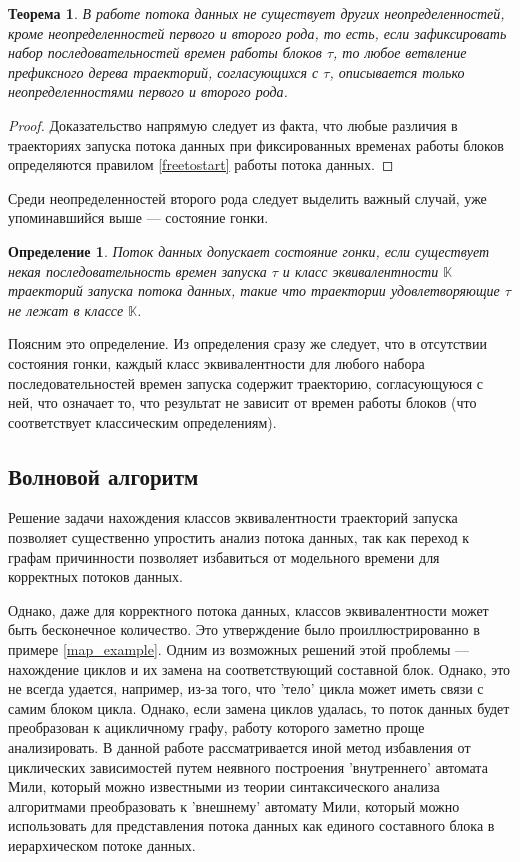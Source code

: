 \documentclass[10pt,a4paper]{article}
\newtheorem{defen}{Определение}
\newtheorem{theorem}{Теорема}
\begin{document}
  \begin{theorem}
    \label{indeterminacy_theorem}
    В работе потока данных не существует других неопределенностей, кроме неопределенностей первого и второго рода, то есть,
    если зафиксировать набор последовательностей времен работы блоков $\tau$, то любое ветвление префиксного дерева траекторий, согласующихся с $\tau$,
    описывается только неопределенностями первого и второго рода.
  \end{theorem}
  \begin{proof}
    Доказательство напрямую следует из факта, что любые различия в траекториях запуска потока данных при фиксированных временах работы блоков определяются
    правилом \eqref{freetostart} работы потока данных.
  \end{proof}
  
  Среди неопределенностей второго рода следует выделить важный случай, уже упоминавшийся выше --- состояние гонки.
  
  \begin{defen}
    Поток данных допускает состояние гонки, если существует некая последовательность времен запуска $\tau$ и класс эквивалентности $\mathbb{K}$
    траекторий запуска потока данных, такие что траектории удовлетворяющие $\tau$ не лежат в классе $\mathbb{K}$.
  \end{defen}
  
  Поясним это определение. Из определения сразу же следует, что в отсутствии состояния гонки, каждый класс эквивалентности для любого набора последовательностей
  времен запуска содержит траекторию, согласующуюся с ней, что означает то,
  что результат не зависит от времен работы блоков (что соответствует классическим определениям).
  
\subsection{Волновой алгоритм}  
  Решение задачи нахождения классов эквивалентности траекторий запуска позволяет существенно упростить анализ потока данных, так как
  переход к графам причинности позволяет избавиться от модельного времени для корректных потоков данных.
  
  Однако, даже для корректного потока данных, классов эквивалентности может быть бесконечное количество. Это утверждение было проиллюстрированно в примере \ref{map_example}.
  Одним из возможных решений этой проблемы --- нахождение циклов и их замена на соответствующий составной блок. Однако, это не всегда удается, например,
  из-за того, что 'тело' цикла может иметь связи с самим блоком цикла. Однако, если замена циклов удалась, то поток данных будет преобразован к ацикличному графу,
  работу которого заметно проще анализировать. В данной работе рассматривается иной метод избавления от циклических зависимостей путем неявного построения
  'внутреннего' автомата Мили, который можно известными из теории синтаксического анализа алгоритмами преобразовать к 'внешнему' автомату Мили, который
  можно использовать для представления потока данных как единого составного блока в иерархическом потоке данных.
\end{document}
